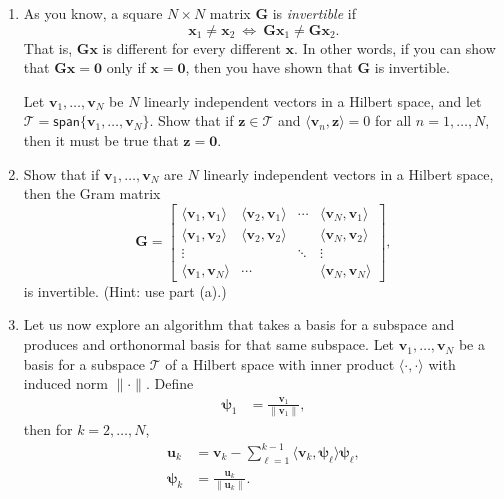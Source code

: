 \documentclass[11pt,twoside]{article}
\begin{document}
\begin{enumerate}[label=(\alph*)]
        \item As you know, a square $N\times N$ matrix $\mathbf{G}$ is {\em invertible} if
\[
        \mathbf{x}_1\not=\mathbf{x}_2~\Leftrightarrow~\mathbf{G}\mathbf{x}_1\neq \mathbf{G}\mathbf{x}_2.
\]
That is, $\mathbf{G}\mathbf{x}$ is different for every different $\mathbf{x}$.  In other words, if you can show that $\mathbf{G}\mathbf{x}=\mathbf{0}$ only if $\mathbf{x}=\mathbf{0}$, then you have shown that $\mathbf{G}$ is invertible.

 Let $\mathbf{v}_1,\ldots,\mathbf{v}_N$ be $N$ linearly independent vectors in a Hilbert space, and let $\mathcal{T} = \mathsf{span}\{\mathbf{v}_1,\ldots,\mathbf{v}_N\}$.  Show that if $\mathbf{z}\in\mathcal{T}$ and $\langle \mathbf{v}_n, \mathbf{z} \rangle =0$ for all $n=1,\ldots,N$, then it must be true that $\mathbf{z}=\mathbf{0}$.
        
\item Show that if $\mathbf{v}_1,\ldots,\mathbf{v}_N$ are $N$ linearly independent vectors in a Hilbert space,  then the Gram matrix
        \[
                \mathbf{G} = 
                \begin{bmatrix}
                        \langle \mathbf{v}_1,\mathbf{v}_1 \rangle & \langle \mathbf{v}_2,\mathbf{v}_1 \rangle & \cdots & \langle \mathbf{v}_N,\mathbf{v}_1 \rangle \\
                        \langle \mathbf{v}_1,\mathbf{v}_2 \rangle & \langle \mathbf{v}_2,\mathbf{v}_2 \rangle & & \langle \mathbf{v}_N,\mathbf{v}_2 \rangle \\
                        \vdots & & \ddots & \vdots\\
                        \langle \mathbf{v}_1,\mathbf{v}_N \rangle & \cdots & & \langle \mathbf{v}_N,\mathbf{v}_N \rangle
                \end{bmatrix},
        \]
        is invertible.  (Hint: use part (a).)

\item Let us now explore an algorithm that takes a basis for a subspace and produces and orthonormal basis for that same subspace.  Let $\mathbf{v}_1,\ldots,\mathbf{v}_N$ be a basis for a subspace $\mathcal{T}$ of a Hilbert space with inner product $\langle\cdot,\cdot\rangle$ with induced norm $\|\cdot\|$.  Define
\begin{align*}
        \mathbf{\psi}_1 &= \frac{\mathbf{v}_1}{\|\mathbf{v}_1\|},
\end{align*}
then for $k=2,\ldots,N$,
\begin{align*}
        \mathbf{u}_k &= \mathbf{v}_k - \sum_{\ell=1}^{k-1}\langle\mathbf{v}_k,\mathbf{\psi}_\ell\rangle\mathbf{\psi}_\ell,\\
        \mathbf{\psi}_k &= \frac{\mathbf{u}_k}{\|\mathbf{u}_k\|}.
\end{align*}


\end{enumerate}
\end{document}
